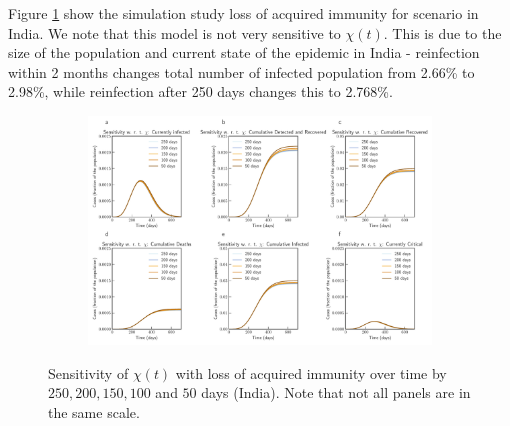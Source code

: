 \documentclass[fleqn,10pt]{wlscirep}
\begin{document}
Figure \ref{fig8} show the simulation study loss of acquired immunity for scenario in India. We note that this model is not very sensitive to $\chi(t)$.  This is due to the size of the population and current state of the epidemic in India - reinfection within 2 months changes total number of infected population from 2.66\% to 2.98\%, while reinfection after 250 days changes this to 2.768\%.

%
\begin{figure}[t!]
	\centering
	\begin{subfigure}[b]{\textwidth}
		\centering
		\includegraphics[width=1\linewidth]{India_scenario_reinfection.pdf}
	\end{subfigure}
	\caption{Sensitivity of $\chi(t)$ with loss of acquired immunity over time by $250, 200, 150, 100$ and $50$ days (India). Note that not all panels are in the same scale.}
	\label{fig8} 
\end{figure}
\end{document}
